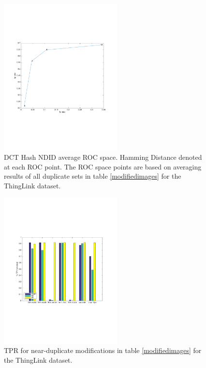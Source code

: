 \documentclass[english,12pt,a4paper,pdftex,elec,utf8, table]{aaltothesis}
\begin{document}
\begin{figure}[htb]
\begin{center}
\includegraphics[height=8cm]{figures/thinglink_dctTotalROC}
\end{center}
\caption{DCT Hash NDID average ROC space. Hamming Distance denoted at each ROC point. The ROC space points are based on averaging results of all duplicate sets in table \ref{modifiedimages} for the ThingLink dataset.}
\label{thinglinkdcttotalroc}
\end{figure}

\begin{figure}[htb]
\begin{center}
\includegraphics[height=8cm]{figures/thinglink_tpBar}
\end{center}
\caption{ TPR for near-duplicate modifications in table \ref{modifiedimages} for the ThingLink dataset.}
\label{thinglinktptotal}
\end{figure}
\end{document}
